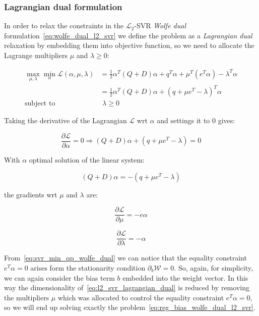 \subsubsection{Lagrangian dual formulation}

In order to relax the constraints in the $\mathcal{L}_2$-SVR \emph{Wolfe dual} formulation~\eqref{eq:wolfe_dual_l2_svr} we define the problem as a \emph{Lagrangian dual} relaxation by embedding them into objective function, so we need to allocate the Lagrange multipliers $\mu$ and $\lambda \geq 0$:

\begin{equation} \label{eq:l2_svr_lagrangian_dual}
	\begin{aligned}
		    \max_{\mu,\lambda} \min_{\alpha} \mathcal{L}(\alpha,\mu,\lambda) &= \frac{1}{2} \alpha^T (Q+D)\alpha+q^T\alpha + \mu^T (e^T \alpha) - \lambda^T \alpha \\
    &= \frac{1}{2} \alpha^T (Q+D)\alpha + (q + \mu e^T - \lambda)^T \alpha \\
    \text{subject to} \quad & \,\, \lambda \geq 0
	\end{aligned}
\end{equation}

Taking the derivative of the Lagrangian $\mathcal{L}$ wrt $\alpha$ and settings it to 0 gives:

\begin{equation} \label{eq:l2_svr_lagrangian_der_a}
	\frac{\partial \mathcal{L}}{\partial \alpha}=0\Rightarrow (Q+D) \alpha + (q + \mu e^T - \lambda) = 0
\end{equation}

With $\alpha$ optimal solution of the linear system:

\begin{equation} \label{eq:l2_svr_lagrangian_sol}
    (Q+D) \alpha = - (q + \mu e^T - \lambda)
\end{equation}

the gradients wrt $\mu$ and $\lambda$ are:

\begin{equation} \label{eq:l2_svr_lagrangian_der_mu}
	\frac{\partial \mathcal{L}}{\partial \mu}=-e \alpha
\end{equation}

\begin{equation} \label{eq:l2_svr_lagrangian_der_lalbda}
    \frac{\partial \mathcal{L}}{\partial \lambda}=-\alpha
\end{equation}

From~\eqref{eq:svr_min_qp_wolfe_dual} we can notice that the equality constraint $e^T \alpha = 0$ arises form the stationarity condition $\partial_{{b}} \mathcal{W}=0$. So, again, for simplicity, we can again consider the bias term $b$ embedded into the weight vector. In this way the dimensionality of~\eqref{eq:l2_svr_lagrangian_dual} is reduced by removing the multipliers $\mu$ which was allocated to control the equality constraint $e^T \alpha=0$, so we will end up solving exactly the problem~\eqref{eq:reg_bias_wolfe_dual_l2_svr}.

